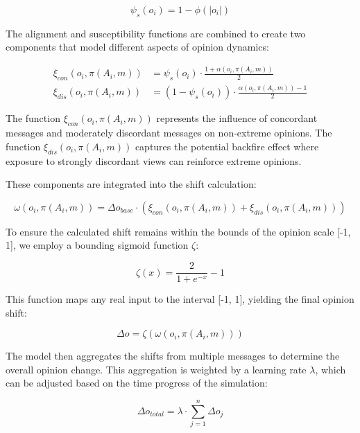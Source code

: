 \begin{equation}
    \psi_s(o_i) = 1 - \phi(|o_i|)
\end{equation}

The alignment and susceptibility functions are combined to create two components that model different aspects of opinion dynamics:

\begin{align}
    \xi_{con}(o_i, \pi(A_i, m)) &= \psi_s(o_i) \cdot \frac{1 + \alpha(o_i, \pi(A_i, m))}{2} \\
    \xi_{dis}(o_i, \pi(A_i, m)) &= (1 - \psi_s(o_i)) \cdot \frac{\alpha(o_i, \pi(A_i, m)) - 1}{2}
\end{align}

The function $\xi_{con}(o_i, \pi(A_i, m))$ represents the influence of concordant messages and moderately discordant messages on non-extreme opinions. The function $\xi_{dis}(o_i, \pi(A_i, m))$ captures the potential backfire effect where exposure to strongly discordant views can reinforce extreme opinions.

These components are integrated into the shift calculation:

\begin{equation}
    \omega(o_i, \pi(A_i, m)) = \Delta o_{base} \cdot (\xi_{con}(o_i, \pi(A_i, m)) + \xi_{dis}(o_i, \pi(A_i, m)))
\end{equation}

To ensure the calculated shift remains within the bounds of the opinion scale [-1, 1], we employ a bounding sigmoid function $\zeta$:

\begin{equation}
    \zeta(x) = \frac{2}{1 + e^{-x}} - 1
\end{equation}

This function maps any real input to the interval [-1, 1], yielding the final opinion shift:

\begin{equation}
    \Delta o = \zeta(\omega(o_i, \pi(A_i, m)))
\end{equation}

The model then aggregates the shifts from multiple messages to determine the overall opinion change. This aggregation is weighted by a learning rate $\lambda$, which can be adjusted based on the time progress of the simulation:

\begin{equation}
    \Delta o_{total} = \lambda \cdot \sum_{j=1}^{n} \Delta o_{j}
\end{equation}

